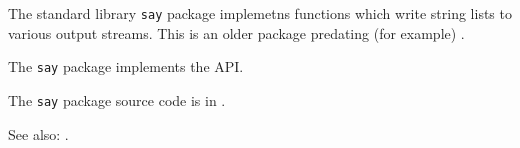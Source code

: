 
The standard library {\tt say} package implemetns functions which write string lists 
to various output streams.  This is an older package predating (for example) .

The {\tt say} package implements the  API.

The {\tt say} package source code is in .

See also:  .

